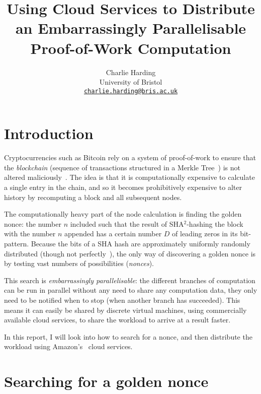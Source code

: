 \documentclass[letterpaper,twocolumn,11pt]{article}
\begin{document}
\title{Using Cloud Services to Distribute an Embarrassingly Parallelisable Proof-of-Work Computation}

\author{
{\rm Charlie Harding}\\
University of Bristol\\
\href{mailto:charlie.harding@bris.ac.uk}{\nolinkurl{charlie.harding@bris.ac.uk}}
} %

\maketitle

\tableofcontents

\section{Introduction}

Cryptocurrencies such as Bitcoin rely on a system of proof-of-work to ensure that the \textit{blockchain} (sequence of transactions structured in a Merkle Tree~\cite{blockonomi_2018}) is not altered maliciously~\cite{bitcoin}. The idea is that it is computationally expensive to calculate a single entry in the chain, and so it becomes prohibitively expensive to alter history by recomputing a block and all subsequent nodes.

The computationally heavy part of the node calculation is finding the golden nonce: the number $n$ included such that the result of SHA$^2$-hashing the block with the number $n$ appended has a certain number $D$ of leading zeros in its bit-pattern. Because the bits of a SHA hash are approximately uniformly randomly distributed (though not perfectly~\cite{cryptoeprint:2008:441}), the only way of discovering a golden nonce is by testing vast numbers of possibilities (\textit{nonces}).

This search is \textit{embarrassingly parallelisable}: the different branches of computation can be run in parallel without any need to share any computation data, they only need to be notified when to stop (when another branch has succeeded). This means it can easily be shared by discrete virtual machines, using commercially available cloud services, to share the workload to arrive at a result faster.

In this report, I will look into how to search for a nonce, and then distribute the workload using Amazon's~\cite{aws} cloud services.

\section{Searching for a golden nonce}
\end{document}
